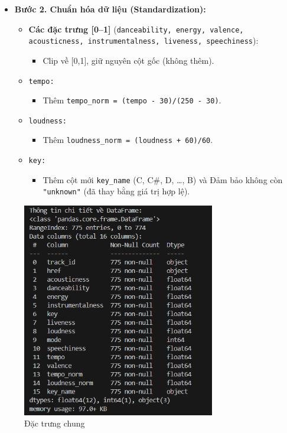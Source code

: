 \begin{itemize}
    \item \textbf{Bước 2. Chuẩn hóa dữ liệu (Standardization):}
    

    
    \begin{itemize}
        \item \textbf{Các đặc trưng [0–1]} (\texttt{danceability, energy, valence, acousticness, instrumentalness, liveness, speechiness}):
        \begin{itemize}
            \item Clip về [0,1], giữ nguyên cột gốc (không thêm).
        \end{itemize}
        \item \texttt{tempo:}
        \begin{itemize}
            \item Thêm \texttt{tempo\_norm = (tempo - 30)/(250 - 30)}.
        \end{itemize}
        \item \texttt{loudness:}
        \begin{itemize}
            \item Thêm \texttt{loudness\_norm = (loudness + 60)/60}.
        \end{itemize}
        \item \texttt{key:}
        \begin{itemize}
            \item Thêm cột mới \texttt{key\_name} (C, C\#, D, …, B) và Đảm bảo không còn \texttt{"unknown"} (đã thay bằng giá trị hợp lệ).
        
        \end{itemize}
    \end{itemize}


\end{itemize}

\begin{figure}[h] %
    \centering %
    \includegraphics[width=0.75\textwidth]{../graphics/data_top50/figure/script/Screenshot 2025-10-02 192420.png} %
    \caption{Đặc trưng chung} %
    \label{File meta-clean} %
\end{figure}


